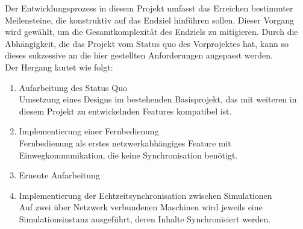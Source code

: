 Der Entwicklungsprozess in diesem Projekt umfasst das Erreichen bestimmter Meilensteine, die konstruktiv auf das Endziel hinführen sollen. Dieser Vorgang wird gewählt, um die Gesamtkomplexität des Endziels zu mitigieren. Durch die Abhängigkeit, die das Projekt vom Status quo des Vorprojektes hat, kann so dieses sukzessive an die hier gestellten Anforderungen angepasst werden.\\
Der Hergang lautet wie folgt:
\begin{enumerate}
\item Aufarbeitung des Status Quo\\
Umsetzung eines Designs im bestehenden Basisprojekt, das mit weiteren in diesem Projekt zu entwickelnden Features kompatibel ist.
\item Implementierung einer Fernbedienung\\
Fernbedienung als erstes netzwerkabhängiges Feature mit Einwegkommunikation, die keine Synchronisation benötigt.
\item Erneute Aufarbeitung
\item Implementierung der Echtzeitsynchronisation zwischen Simulationen\\
Auf zwei über Netzwerk verbundenen Maschinen wird jeweils eine Simulationsinstanz ausgeführt, deren Inhalte Synchronisiert werden.
\end{enumerate}

